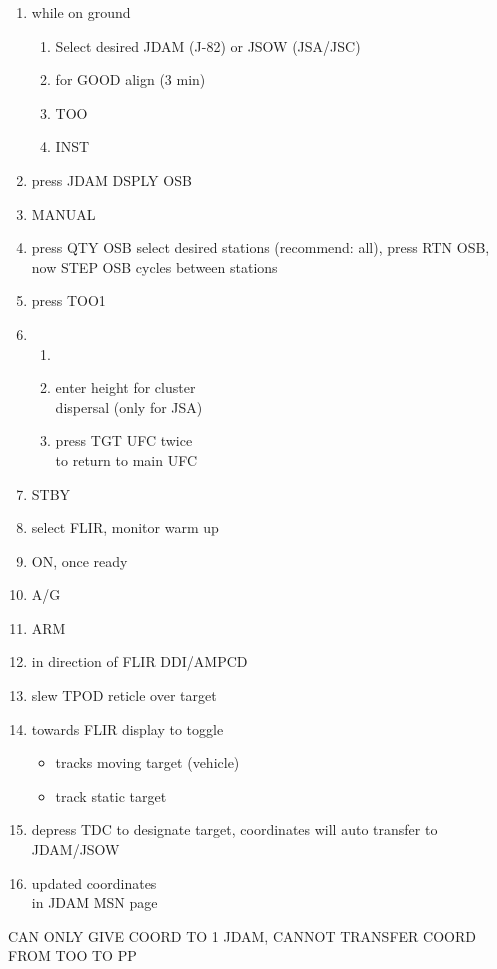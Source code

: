 \documentclass[fontInter]{TechCheck}
\begin{document}
	\begin{enumerate}
		\item {}\dotfill while on ground
		\begin{enumerate}
			\item Select desired JDAM (J-82) or JSOW (JSA/JSC)
			\item {}\dotfill for GOOD align (3 min)
			\item {}\dotfill TOO
			\item {}\dotfill INST
		\end{enumerate}
		\item {}\dotfill press JDAM DSPLY OSB
		\item {}\dotfill MANUAL
		\item {}\dotfill press QTY OSB select desired stations (recommend: all), press RTN OSB, now STEP OSB cycles between stations
		\item {}\dotfill press TOO1
		\item {}
		\begin{enumerate}
			\item {}
			\item {}\dotfill enter height for cluster \\ \hfill dispersal (only for JSA)
			\item {}\dotfill press TGT UFC twice \\ \hfill to return to main UFC
		\end{enumerate}
		\item {}\dotfill STBY
		\item {}\dotfill select FLIR, monitor warm up
		\item {}\dotfill ON, once ready
		\item {}\dotfill A/G
		\item {}\dotfill ARM
		\item {}\dotfill in direction of FLIR DDI/AMPCD
		\item {}\dotfill slew TPOD reticle over target
		\item {} towards FLIR display to toggle
		\begin{itemize}
			\item {} tracks moving target (vehicle)
			\item {} track static target
		\end{itemize}
		\item {}\dotfill depress TDC to designate target, coordinates will auto transfer to JDAM/JSOW
		\item {}\dotfill updated coordinates \\ \hfill in JDAM MSN page
	\end{enumerate}
	 CAN ONLY GIVE COORD TO 1 JDAM, CANNOT TRANSFER COORD FROM TOO TO PP
\end{document}
